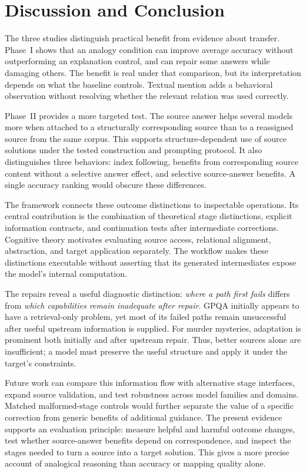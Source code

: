 \section{Discussion and Conclusion}
\label{sec:discussion}
The three studies distinguish practical benefit from evidence about transfer. Phase~I shows that an analogy condition can improve average accuracy without outperforming an explanation control, and can repair some answers while damaging others. The benefit is real under that comparison, but its interpretation depends on what the baseline controls. Textual mention adds a behavioral observation without resolving whether the relevant relation was used correctly.

Phase~II provides a more targeted test. The source answer helps several models more when attached to a structurally corresponding source than to a reassigned source from the same corpus. This supports structure-dependent use of source solutions under the tested construction and prompting protocol. It also distinguishes three behaviors: index following, benefits from corresponding source content without a selective answer effect, and selective source-answer benefits. A single accuracy ranking would obscure these differences.

The framework connects these outcome distinctions to inspectable operations. Its central contribution is the combination of theoretical stage distinctions, explicit information contracts, and continuation tests after intermediate corrections. Cognitive theory motivates evaluating source access, relational alignment, abstraction, and target application separately. The workflow makes these distinctions executable without asserting that its generated intermediates expose the model's internal computation.

The repairs reveal a useful diagnostic distinction: \emph{where a path first fails} differs from \emph{which capabilities remain inadequate after repair}. GPQA initially appears to have a retrieval-only problem, yet most of its failed paths remain unsuccessful after useful upstream information is supplied. For murder mysteries, adaptation is prominent both initially and after upstream repair. Thus, better sources alone are insufficient; a model must preserve the useful structure and apply it under the target's constraints.

Future work can compare this information flow with alternative stage interfaces, expand source validation, and test robustness across model families and domains. Matched malformed-stage controls would further separate the value of a specific correction from generic benefits of additional guidance. The present evidence supports an evaluation principle: measure helpful and harmful outcome changes, test whether source-answer benefits depend on correspondence, and inspect the stages needed to turn a source into a target solution. This gives a more precise account of analogical reasoning than accuracy or mapping quality alone.
